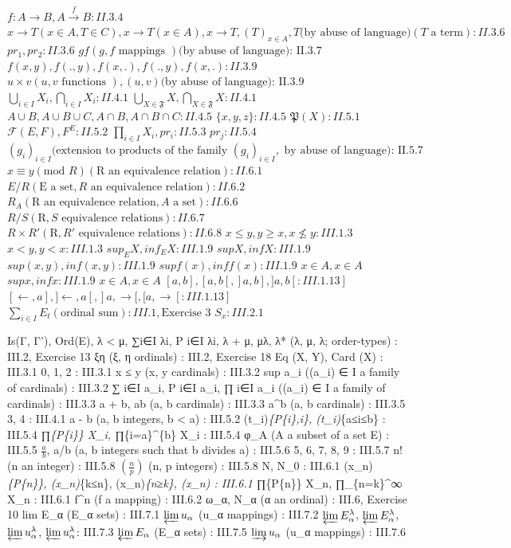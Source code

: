 \(f: A \to B, A \xrightarrow{f} B: II.3.4\) \(x \to T (x \in A, T \in C), x \to T (x \in A), x \to T, (T)_{x \in A}, T \text {(by abuse of language)} (T \text { a term}): II.3.6\) \(pr_1, pr_2: II.3.6\) \(gf(g, f \text { mappings }) \text {(by abuse of language): II.3.7}\) \(f(x, y), f(., y), f(x, .), f(., y), f(x, .): II.3.9\) \(u \times v (u, v \text { functions }), (u, v) \text {(by abuse of language): II.3.9}\) \(\bigcup_{i \in I} X_i, \bigcap_{i \in I} X_i: II.4.1\) \(\bigcup_{X \in \mathfrak{F}} X, \bigcap_{X \in \mathfrak{F}} X: II.4.1\) \(A \cup B, A \cup B \cup C, A \cap B, A \cap B \cap C: II.4.5\) \(\{x, y, z\}: II.4.5\) \(\mathfrak{P}(X): II.5.1\) \(\mathcal{F}(E, F), F^E: II.5.2\) \(\prod_{i \in I} X_i, pr_i: II.5.3\) \(pr_j: II.5.4\) \((g_i)_{i \in I} \text {(extension to products of the family } (g_i)_{i \in I}, \text { by abuse of language): II.5.7}\) \(x \equiv y (\text {mod } R) (\text {R an equivalence relation}): II.6.1\) \(E/R (\text {E a set}, R \text { an equivalence relation}): II.6.2\) \(R_A (\text {R an equivalence relation}, A \text { a set}): II.6.6\) \(R/S (\text {R}, S \text { equivalence relations}): II.6.7\) \(R \times R' (\text {R}, R' \text { equivalence relations}): II.6.8\) \(x \leqslant y, y \geqslant x, x \not\leqslant y: III.1.3\) \(x < y, y < x: III.1.3\) \(sup_E X, inf_E X: III.1.9\) \(sup X, inf X: III.1.9\) \(sup (x, y), inf (x, y): III.1.9\) \(sup f(x), inf f(x): III.1.9\) \(x \in A, x \in A\) \(sup x, inf x: III.1.9\) \(x \in A, x \in A\) \([a, b], [a, b[, ]a, b], ]a, b[: III.1.13]\) \([\leftarrow, a], ]\leftarrow, a[, ]a, \rightarrow [, [a, \rightarrow[: III.1.13]\) \(\sum_{i \in I} E_t (\text {ordinal sum}): III.1, \text{Exercise 3}\) \(S_x: III.2.1\)

Is(Γ, Γ'), Ord(E), λ \textless{} μ, ∑i∈I λi, P i∈I λi, λ + μ, μλ, λ* (λ, μ, λ; order-types) : III.2, Exercise 13 ξη (ξ, η ordinals) : III.2, Exercise 18 Eq (X, Y), Card (X) : III.3.1 0, 1, 2 : III.3.1 x ≤ y (x, y cardinals) : III.3.2 sup a\_i ((a\_i) ∈ I a family of cardinals) : III.3.2 ∑ i∈I a\_i, P i∈I a\_i, ∏ i∈I a\_i ((a\_i) ∈ I a family of cardinals) : III.3.3 a + b, ab (a, b cardinals) : III.3.3 a\^{}b (a, b cardinals) : III.3.5 3, 4 : III.4.1 a - b (a, b integers, b \textless{} a) : III.5.2 (t\_i)\emph{\{P\{i\},i\}, (t\_i)}\{a≤i≤b\} : III.5.4 ∏\emph{\{P\{i\}\} X\_i, ∏}\{i=a\}\^{}\{b\} X\_i : III.5.4 φ\_A (A a subset of a set E) : III.5.5 \(\frac{a}{b}\), a/b (a, b integers such that b divides a) : III.5.6 5, 6, 7, 8, 9 : III.5.7 n! (n an integer) : III.5.8 \(\left(\frac{n}{p}\right)\) (n, p integers) : III.5.8 N, N\_0 : III.6.1 (x\_n)\emph{\{P\{n\}\}, (x\_n)}\{k≤n\}, (x\_n)\emph{\{n≥k\}, (x\_n) : III.6.1 ∏}\{P\{n\}\} X\_n, ∏\_\{n=k\}\^{}∞ X\_n : III.6.1 f\^{}n (f a mapping) : III.6.2 ω\_α, N\_α (α an ordinal) : III.6, Exercise 10 lim E\_α (E\_α sets) : III.7.1 \(\varprojlim u_\alpha\) (u\_α mappings) : III.7.2 \(\varprojlim E_\alpha^\lambda\), \(\varprojlim E_\alpha^\lambda\), \(\varprojlim u_\alpha^\lambda\), \(\varprojlim u_\alpha^\lambda\): III.7.3 \(\varprojlim E_\alpha\) (E\_α sets) : III.7.5 \(\varinjlim u_\alpha\) (u\_α mappings) : III.7.6

